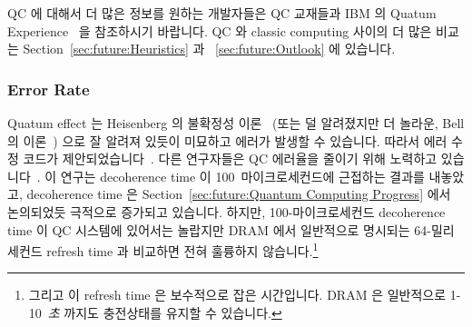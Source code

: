 QC 에 대해서 더 많은 정보를 원하는 개발자들은 QC 교재들과 IBM 의 Quatum
Experience~\cite{IBM2016QuantumExperience} 을 참조하시기 바랍니다.
QC 와 classic computing 사이의 더 많은 비교는
Section~\ref{sec:future:Heuristics} 과 ~\ref{sec:future:Outlook} 에 있습니다.

\subsubsection{Error Rate}
\label{sec:future:Error Rate}

Quatum effect 는 Heisenberg 의 불확정성
이론~\cite{WeinerHeisenberg1927Uncertain} (또는 덜 알려졌지만 더 놀라운, Bell
의 이론~\cite{JohnSBell1964EPRparadox}) 으로 잘 알려져 있듯이 미묘하고 에러가
발생할 수 있습니다.
따라서 에러 수정 코드가
제안되었습니다~\cite{ADCorcoles2015QuantumErrorDetection}.
다른 연구자들은 QC 에러율을 줄이기 위해 노력하고
있습니다~\cite{PhysRevB.77.180502,PhysRevLett.107.240501,PhysRevLett.111.080502,PhysRevB.86.100506,KristanTemme2016QC-error-mitigation}.
이 연구는 decoherence time 이 100~마이크로세컨드에 근접하는 결과를 내놓았고,
decoherence time 은 Section~\ref{sec:future:Quantum Computing Progress} 에서
논의되었듯 극적으로 증가되고 있습니다.
하지만, 100-마이크로세컨드 decoherence time 이 QC 시스템에 있어서는 놀랍지만
DRAM 에서 일반적으로 명시되는 64-밀리세컨드 refresh time 과 비교하면 전혀
훌륭하지 않습니다.\footnote{
	그리고 이 refresh time 은 보수적으로 잡은 시간입니다. DRAM 은
	일반적으로 1-10~\emph{초} 까지도 충전상태를 유지할 수 있습니다.}
\iffalse

